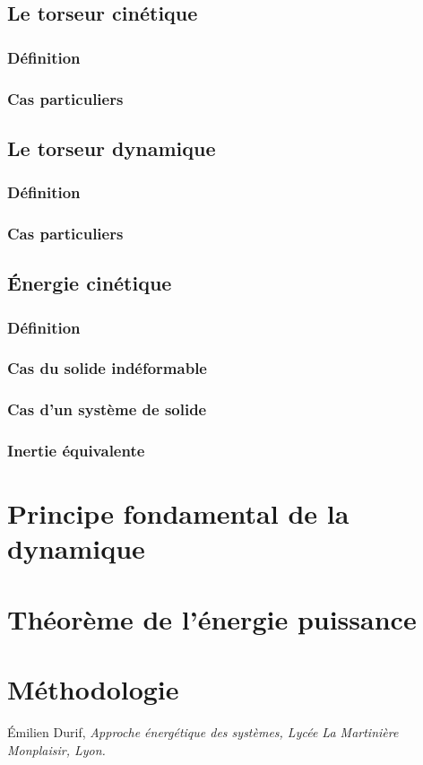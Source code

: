 \documentclass[10pt,fleqn]{article} %
\begin{document}
\subsection{Le torseur cinétique}
\subsubsection{Définition}
\subsubsection{Cas particuliers}

\subsection{Le torseur dynamique}
\subsubsection{Définition}
\subsubsection{Cas particuliers}

\subsection{Énergie cinétique}
\subsubsection{Définition}
\subsubsection{Cas du solide indéformable}
\subsubsection{Cas d'un système de solide}
\subsubsection{Inertie équivalente}

\section{Principe fondamental de la dynamique}

\section{Théorème de l'énergie puissance}

\section{Méthodologie}





\begin{thebibliography}{2}
    Émilien Durif, {\it Approche énergétique des systèmes, Lycée La Martinière Monplaisir, Lyon.}
\end{thebibliography}
\end{document}
